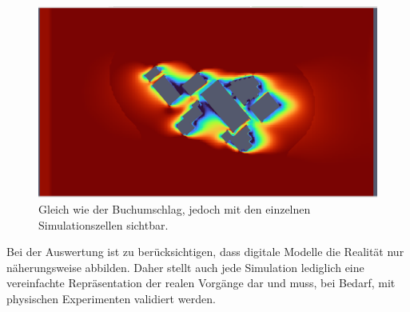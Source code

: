 \begin{figure}
    \centering
    \includegraphics[width=1\textwidth]{papers/openfoam/Bilder/vorschlag_Wind_Westen_10m_blocky.png}
    \caption{Gleich wie der Buchumschlag, jedoch mit den einzelnen Simulationszellen sichtbar.}
    \label{fig:vorschWindWestBlocky}
\end{figure}

Bei der Auswertung ist zu berücksichtigen, dass digitale Modelle die Realität nur näherungsweise abbilden. 
Daher stellt auch jede Simulation lediglich eine vereinfachte Repräsentation der realen Vorgänge dar und muss, bei Bedarf, mit physischen Experimenten validiert werden.
